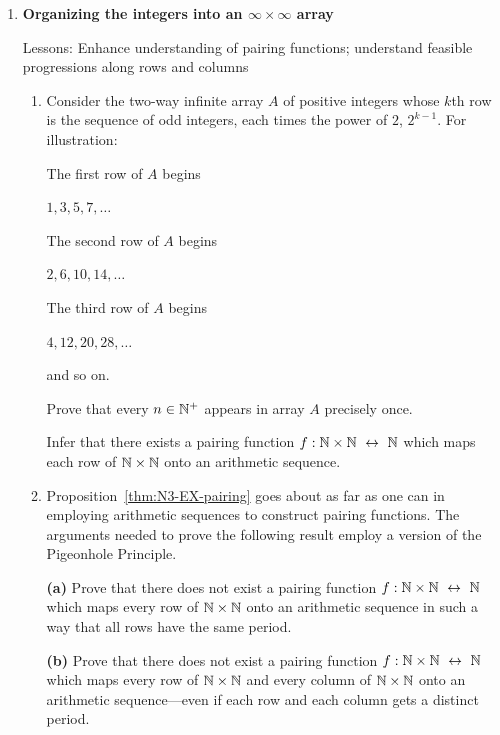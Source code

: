 \begin{enumerate}
\item
{\bf Organizing the integers into an $\infty \times \infty$ array}

{\sc Lessons:} Enhance understanding of pairing functions; understand feasible progressions along rows and columns

\smallskip

  \begin{enumerate}
  \item
Consider the two-way infinite array $A$ of positive integers whose $k$th row is the sequence of odd integers, each times the power of $2$, $2^{k-1}$.  For illustration:

The first row of $A$ begins

\hspace*{.2in}$1, 3, 5, 7, \ldots$

The second row of $A$ begins

\hspace*{.2in}$2, 6, 10, 14, \ldots$

The third row of $A$ begins

\hspace*{.2in}$4, 12, 20, 28, \ldots$

and so on.

\begin{prop}
\label{thm:N3-EX-pairing}
Prove that every $n \in \mathbb{N}^+$ appears in array $A$ precisely once.

\smallskip

Infer that there exists a pairing function $f: \N \times \N \ \leftrightarrow \ \N$ which maps each row of $\mathbb{N} \times \mathbb{N}$ onto an arithmetic sequence.
\end{prop}

  \medskip\item
Proposition~\ref{thm:N3-EX-pairing} goes about as far as one can in employing arithmetic sequences to construct pairing functions.  The arguments needed to prove the following result employ a version of the Pigeonhole Principle.

\begin{prop}
{\bf (a)}
Prove that there does not exist a pairing function $f: \N \times \N \ \leftrightarrow \ \N$ which maps every row of $\mathbb{N} \times \mathbb{N}$ onto an arithmetic sequence in such a way that all rows have the same period.

\smallskip

{\bf (b)}
Prove that there does not exist a pairing function $f: \N \times \N \ \leftrightarrow \ \N$ which maps every row of $\mathbb{N} \times \mathbb{N}$ and every column of $\mathbb{N} \times \mathbb{N}$ onto an arithmetic sequence---even if each row and each column gets a distinct period.
\end{prop}
  \end{enumerate}


\end{enumerate}
